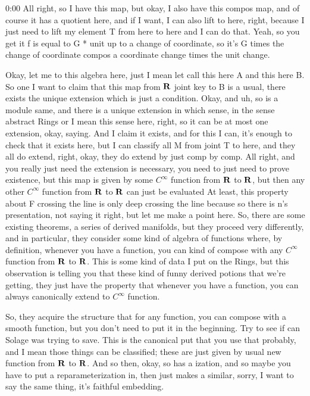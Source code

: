 \begin{unfinished}{0:00}
All right, so I have this map, but okay, I also have this compos map, and of course it has a quotient here, and if I want, I can also lift to here, right, because I just need to lift my element T from here to here and I can do that. Yeah, so you get it f is equal to G * unit up to a change of coordinate, so it's G times the change of coordinate compos a coordinate change times the unit change.

Okay, let me to this algebra here, just I mean let call this here A and this here B. So one I want to claim that this map from $\mathbf R$ joint key to B is a usual, there exists the unique extension which is just a condition. Okay, and uh, so is a module same, and there is a unique extension in which sense, in the sense abstract Rings or I mean this sense here, right, so it can be at most one extension, okay, saying. And I claim it exists, and for this I can, it's enough to check that it exists here, but I can classify all M from joint T to here, and they all do extend, right, okay, they do extend by just comp by comp. All right, and you really just need the extension is necessary, you need to just need to prove existence, but this map is given by some $C^\infty$ function from $\mathbf R$ to $\mathbf R$, but then any other $C^\infty$ function from $\mathbf R$ to $\mathbf R$ can just be evaluated
At least, this property about F crossing the line is only deep crossing the line because so there is n's presentation, not saying it right, but let me make a point here. So, there are some existing theorems, a series of derived manifolds, but they proceed very differently, and in particular, they consider some kind of algebra of functions where, by definition, whenever you have a function, you can kind of compose with any $C^\infty$ function from $\mathbf R$ to $\mathbf R$. This is some kind of data I put on the Rings, but this observation is telling you that these kind of funny derived potions that we're getting, they just have the property that whenever you have a function, you can always canonically extend to $C^\infty$ function. 

So, they acquire the structure that for any function, you can compose with a smooth function, but you don't need to put it in the beginning. Try to see if can Solage was trying to save. This is the canonical put that you use that probably, and I mean those things can be classified; these are just given by usual new function from $\mathbf R$ to $\mathbf R$. And so then, okay, so has a ization, and so maybe you have to put a reparameterization in, then just makes a similar, sorry, I want to say the same thing, it's faithful embedding. 


\end{unfinished}
